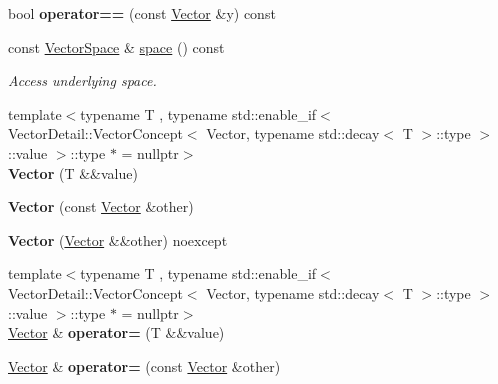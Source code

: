 \begin{DoxyCompactItemize}
\item 
bool {\bfseries operator==} (const \hyperlink{classSpacy_1_1Vector}{Vector} \&y) const \hypertarget{classSpacy_1_1Vector_a0d634e69572e8da07c3c7056ec911208}{}\label{classSpacy_1_1Vector_a0d634e69572e8da07c3c7056ec911208}

\item 
const \hyperlink{classSpacy_1_1VectorSpace}{Vector\+Space} \& \hyperlink{classSpacy_1_1Vector_a8a549d4ed045ddf563afca5bc942397b}{space} () const \hypertarget{classSpacy_1_1Vector_a8a549d4ed045ddf563afca5bc942397b}{}\label{classSpacy_1_1Vector_a8a549d4ed045ddf563afca5bc942397b}

\begin{DoxyCompactList}\small\item\em Access underlying space. \end{DoxyCompactList}\item 
{\footnotesize template$<$typename T , typename std\+::enable\+\_\+if$<$ Vector\+Detail\+::\+Vector\+Concept$<$ Vector, typename std\+::decay$<$ T $>$\+::type $>$\+::value $>$\+::type $\ast$  = nullptr$>$ }\\{\bfseries Vector} (T \&\&value)\hypertarget{classSpacy_1_1Vector_a5c5ad7607366066bb752d78611d899cf}{}\label{classSpacy_1_1Vector_a5c5ad7607366066bb752d78611d899cf}

\item 
{\bfseries Vector} (const \hyperlink{classSpacy_1_1Vector}{Vector} \&other)\hypertarget{classSpacy_1_1Vector_ae104dbb1e447a732611cbc2dea2faeb0}{}\label{classSpacy_1_1Vector_ae104dbb1e447a732611cbc2dea2faeb0}

\item 
{\bfseries Vector} (\hyperlink{classSpacy_1_1Vector}{Vector} \&\&other) noexcept\hypertarget{classSpacy_1_1Vector_ae328ef6fcf519c6285593cb158c9cc49}{}\label{classSpacy_1_1Vector_ae328ef6fcf519c6285593cb158c9cc49}

\item 
{\footnotesize template$<$typename T , typename std\+::enable\+\_\+if$<$ Vector\+Detail\+::\+Vector\+Concept$<$ Vector, typename std\+::decay$<$ T $>$\+::type $>$\+::value $>$\+::type $\ast$  = nullptr$>$ }\\\hyperlink{classSpacy_1_1Vector}{Vector} \& {\bfseries operator=} (T \&\&value)\hypertarget{classSpacy_1_1Vector_a1b2ea8c4f0e52b3ca5f6900537daed02}{}\label{classSpacy_1_1Vector_a1b2ea8c4f0e52b3ca5f6900537daed02}

\item 
\hyperlink{classSpacy_1_1Vector}{Vector} \& {\bfseries operator=} (const \hyperlink{classSpacy_1_1Vector}{Vector} \&other)\hypertarget{classSpacy_1_1Vector_a3184052aead1e3d2fc2b72f9b23607d2}{}\label{classSpacy_1_1Vector_a3184052aead1e3d2fc2b72f9b23607d2}


\end{DoxyCompactItemize}
